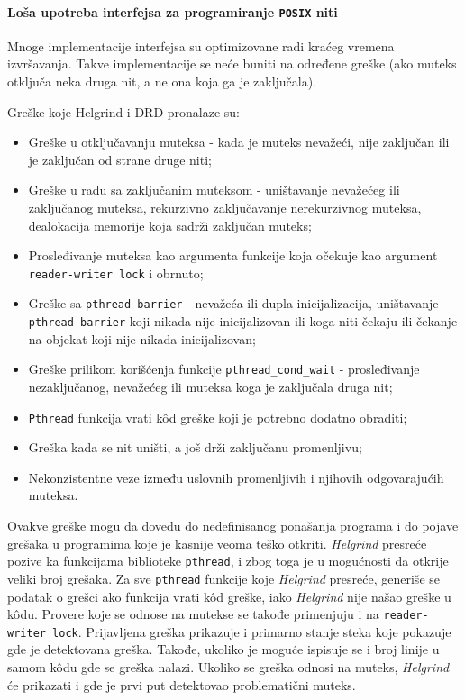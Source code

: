 \paragraph{\texorpdfstring{Loša upotreba interfejsa za programiranje \texttt{POSIX} niti}{Loša upotreba interfejsa za programiranje POSIX niti}}\label{loux161a-upotreba-intefejsa-za-programiranje-posix-niti}

Mnoge implementacije interfejsa su optimizovane radi kraćeg vremena izvršavanja. Takve implementacije se neće buniti na određene greške (ako muteks otključa neka druga nit, a ne ona koja ga je zaključala).

Greške koje Helgrind i DRD pronalaze su:

\begin{itemize}
\item
  Greške u otključavanju muteksa - kada je muteks nevažeći, nije zaključan ili je zaključan od strane druge niti;
\item
  Greške u radu sa zaključanim muteksom - uništavanje nevažećeg ili zaključanog muteksa, rekurzivno zaključavanje nerekurzivnog muteksa, dealokacija memorije koja sadrži zaključan muteks;
\item
  Prosleđivanje muteksa kao argumenta funkcije koja očekuje kao argument \texttt{reader-writer\ lock} i obrnuto;
\item
  Greške sa \texttt{pthread\ barrier} - nevažeća ili dupla inicijalizacija, uništavanje \texttt{pthread\ barrier} koji nikada nije inicijalizovan ili koga niti čekaju ili čekanje na objekat koji nije nikada inicijalizovan;
\item
  Greške prilikom korišćenja funkcije \texttt{pthread\_cond\_wait} - prosleđivanje nezaključanog, nevažećeg ili muteksa koga je zaključala druga nit;
\item
  \texttt{Pthread} funkcija vrati kôd greške koji je potrebno dodatno obraditi;
\item
  Greška kada se nit uništi, a još drži zaključanu promenljivu;
\item
  Nekonzistentne veze između uslovnih promenljivih i njihovih odgovarajućih muteksa.
\end{itemize}

Ovakve greške mogu da dovedu do nedefinisanog ponašanja programa i do pojave grešaka u programima koje je kasnije veoma teško otkriti. \emph{Helgrind} presreće pozive ka funkcijama biblioteke \texttt{pthread}, i zbog toga je u mogućnosti da otkrije veliki broj grešaka. Za sve \texttt{pthread} funkcije koje \emph{Helgrind} presreće, generiše se podatak o grešci ako funkcija vrati kôd greške, iako \emph{Helgrind} nije našao greške u kôdu. Provere koje se odnose na mutekse se takođe primenjuju i na \texttt{reader-writer\ lock}. Prijavljena greška prikazuje i primarno stanje steka koje pokazuje gde je detektovana greška. Takođe, ukoliko je moguće ispisuje se i broj linije u samom kôdu gde se greška nalazi. Ukoliko se greška odnosi na muteks, \emph{Helgrind} će prikazati i gde je prvi put detektovao problematični muteks.

